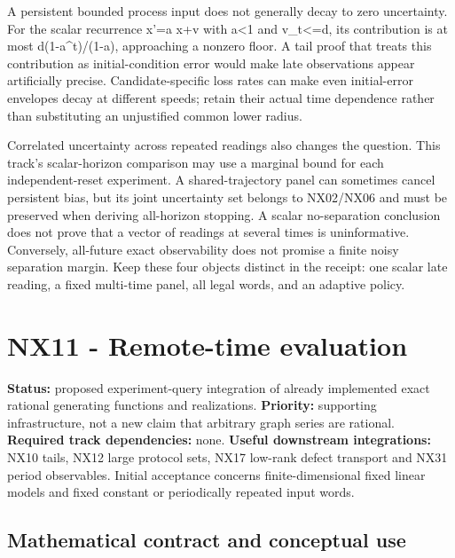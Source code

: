 \documentclass[
  11pt,
  a4paper,
]{report}
\begin{document}
A persistent bounded process input does not generally decay to zero
uncertainty. For the scalar recurrence x'=a x+v with
\textbar a\textbar\textless1 and \textbar v\_t\textbar\textless=d, its
contribution is at most
d(1-\textbar a\textbar\^{}t)/(1-\textbar a\textbar), approaching a
nonzero floor. A tail proof that treats this contribution as
initial-condition error would make late observations appear artificially
precise. Candidate-specific loss rates can make even initial-error
envelopes decay at different speeds; retain their actual time dependence
rather than substituting an unjustified common lower radius.

Correlated uncertainty across repeated readings also changes the
question. This track's scalar-horizon comparison may use a marginal
bound for each independent-reset experiment. A shared-trajectory panel
can sometimes cancel persistent bias, but its joint uncertainty set
belongs to NX02/NX06 and must be preserved when deriving all-horizon
stopping. A scalar no-separation conclusion does not prove that a vector
of readings at several times is uninformative. Conversely, all-future
exact observability does not promise a finite noisy separation margin.
Keep these four objects distinct in the receipt: one scalar late
reading, a fixed multi-time panel, all legal words, and an adaptive
policy.

\hypertarget{nx11---remote-time-evaluation}{%
\chapter{NX11 - Remote-time
evaluation}\label{nx11---remote-time-evaluation}}

\textbf{Status:} proposed experiment-query integration of already
implemented exact rational generating functions and realizations.
\textbf{Priority:} supporting infrastructure, not a new claim that
arbitrary graph series are rational. \textbf{Required track
dependencies:} none. \textbf{Useful downstream integrations:} NX10
tails, NX12 large protocol sets, NX17 low-rank defect transport and NX31
period observables. Initial acceptance concerns finite-dimensional fixed
linear models and fixed constant or periodically repeated input words.

\hypertarget{mathematical-contract-and-conceptual-use}{%
\section{Mathematical contract and conceptual
use}\label{mathematical-contract-and-conceptual-use}}
\end{document}
